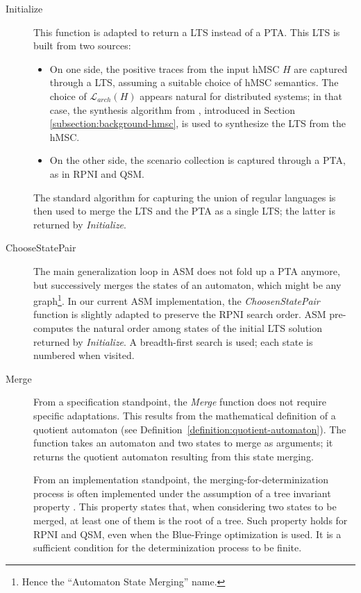 \begin{description}

\item[Initialize] This function is adapted to return a LTS instead of a PTA. This LTS is built from two sources:
\begin{itemize}
\item On one side, the positive traces from the input hMSC $H$ are captured through a LTS, assuming a suitable choice of hMSC semantics. The choice of $\mathcal{L}_{arch}(H)$ appears natural for distributed systems; in that case, the synthesis algorithm from \cite{Uchitel:2003}, introduced in Section \ref{subsection:background-hmsc}, is used to synthesize the LTS from the hMSC.
\item On the other side, the scenario collection is captured through a PTA, as in RPNI and QSM.
\end{itemize}
The standard algorithm for capturing the union of regular languages \cite{Hopcroft:1979} is then used to merge the LTS and the PTA as a single LTS; the latter is returned by \emph{Initialize}.

\item[ChooseStatePair] The main generalization loop in ASM does not fold up a PTA anymore, but successively merges the states of an automaton, which might be any graph\footnote{Hence the ``Automaton State Merging'' name.}. In our current ASM implementation, the \emph{ChoosenStatePair} function is slightly adapted to preserve the RPNI search order. ASM pre-computes the natural order among states of the initial LTS solution returned by \emph{Initialize}. A breadth-first search is used; each state is numbered when visited.

\item[Merge] From a specification standpoint, the \emph{Merge} function does not require specific adaptations. This results from the mathematical definition of a quotient automaton (see Definition~\ref{definition:quotient-automaton}). The function takes an automaton and two states to merge as arguments; it returns the quotient automaton resulting from this state merging. 

From an implementation standpoint, the merging-for-determinization process is often implemented under the assumption of a tree invariant property \cite{Lang:1998}. This property states that, when considering two states to be merged, at least one of them is the root of a tree. Such property holds for RPNI and QSM, even when the Blue-Fringe optimization is used. It is a sufficient condition for the determinization process to be finite. 


\end{description}
